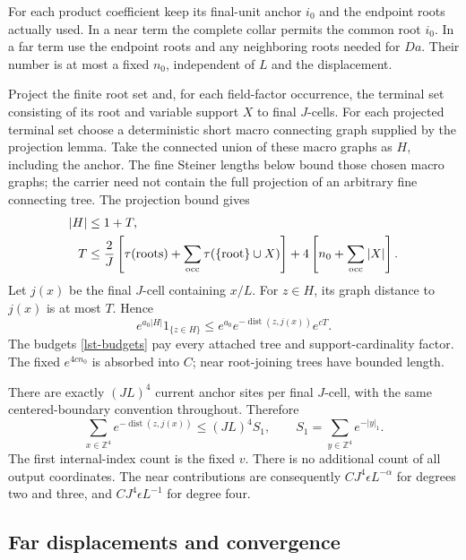 For each product coefficient keep its final-unit anchor
\(i_0\) and the endpoint roots actually used. In a near
term the complete collar permits the common root \(i_0\).
In a far term use the endpoint roots and any neighboring
roots needed for \(Da\). Their number is at most a fixed
\(n_0\), independent of \(L\) and the displacement.

Project the finite root set and, for each field-factor
occurrence, the terminal set consisting of its root
and variable support \(X\) to final \(J\)-cells.
For each projected terminal set choose a deterministic
short macro connecting graph supplied by the projection
lemma. Take the connected union of these macro graphs
as \(H\), including the anchor. The fine Steiner
lengths below bound those chosen macro graphs; the
carrier need not contain the full projection of an
arbitrary fine connecting tree. The projection bound gives
\begin{align}
 |H|&\le1+T,\notag\\
 T&\le\frac2J\left[
       \tau(\text{roots})+
       \sum_{\mathrm{occ}}\tau(\{\text{root}\}\cup X)\right]
         +4\left[n_0+\sum_{\mathrm{occ}}|X|\right].
 \label{lst-tree-bound}
\end{align}
Let \(j(x)\) be the final \(J\)-cell containing \(x/L\).
For \(z\in H\), its graph distance to \(j(x)\) is at
most \(T\). Hence
\begin{equation}
 e^{a_0|H|}1_{\{z\in H\}}
 \le e^{a_0}e^{-\operatorname{dist}(z,j(x))}e^{cT}.
 \label{lst-reroot}
\end{equation}
The budgets \eqref{lst-budgets} pay every attached
tree and support-cardinality factor. The fixed
\(e^{4cn_0}\) is absorbed into \(C\); near root-joining
trees have bounded length.

There are exactly \((JL)^4\) current anchor sites
per final \(J\)-cell, with the same centered-boundary
convention throughout. Therefore
\begin{equation}
 \sum_{x\in\mathbb Z^4}
 e^{-\operatorname{dist}(z,j(x))}
 \le (JL)^4 S_1,\qquad
 S_1=\sum_{y\in\mathbb Z^4}e^{-|y|_1}.
 \label{lst-anchor-count}
\end{equation}
The first internal-index count is the fixed \(v\).
There is no additional count of all output coordinates.
The near contributions are consequently
\(CJ^4\epsilon L^{-\alpha}\) for degrees two and
three, and \(CJ^4\epsilon L^{-1}\) for degree four.

\subsection{Far displacements and convergence}
\label{lst-far-section}


